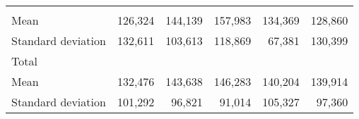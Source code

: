 \begin{tabular}{llllll}
  \multicolumn{1}{|r}{} &
  \multicolumn{1}{r}{} &
  \multicolumn{1}{r}{} &
  \multicolumn{1}{r}{} &
  \multicolumn{1}{r}{} \\
\multicolumn{1}{l}{\hspace{4em}Mean} &
  \multicolumn{1}{|r}{126,324} &
  \multicolumn{1}{r}{144,139} &
  \multicolumn{1}{r}{157,983} &
  \multicolumn{1}{r}{134,369} &
  \multicolumn{1}{r}{128,860} \\
\multicolumn{1}{l}{\hspace{4em}Standard deviation} &
  \multicolumn{1}{|r}{132,611} &
  \multicolumn{1}{r}{103,613} &
  \multicolumn{1}{r}{118,869} &
  \multicolumn{1}{r}{67,381} &
  \multicolumn{1}{r}{130,399} \\
\multicolumn{1}{l}{\hspace{3em}Total} &
  \multicolumn{1}{|r}{} &
  \multicolumn{1}{r}{} &
  \multicolumn{1}{r}{} &
  \multicolumn{1}{r}{} &
  \multicolumn{1}{r}{} \\
\multicolumn{1}{l}{\hspace{4em}Mean} &
  \multicolumn{1}{|r}{132,476} &
  \multicolumn{1}{r}{143,638} &
  \multicolumn{1}{r}{146,283} &
  \multicolumn{1}{r}{140,204} &
  \multicolumn{1}{r}{139,914} \\
\multicolumn{1}{l}{\hspace{4em}Standard deviation} &
  \multicolumn{1}{|r}{101,292} &
  \multicolumn{1}{r}{96,821} &
  \multicolumn{1}{r}{91,014} &
  \multicolumn{1}{r}{105,327} &
  \multicolumn{1}{r}{97,360} \\
\cline{1-6}
\end{tabular}

